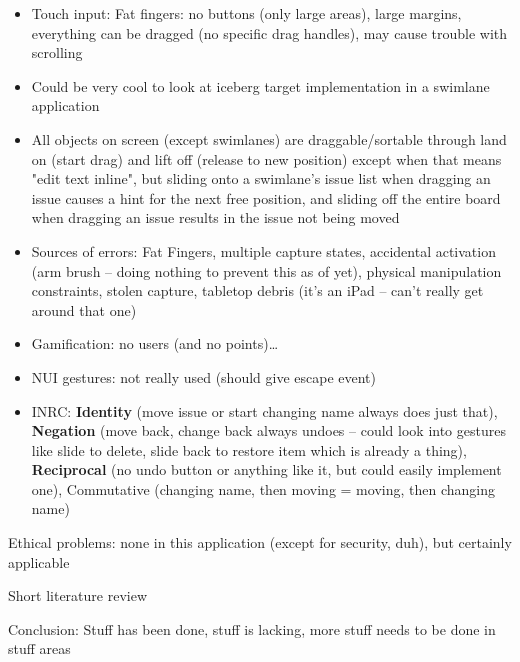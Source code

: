 \begin{itemize}
  \item Touch input: Fat fingers: no buttons (only large areas), large margins, everything can be dragged (no specific drag handles), may cause trouble with scrolling
  \item Could be very cool to look at iceberg target implementation in a swimlane application %
  \item All objects on screen (except swimlanes) are draggable/sortable through land on (start drag) and lift off (release to new position) except when that means "edit text inline", but sliding onto a swimlane's issue list when dragging an issue causes a hint for the next free position, and sliding off the entire board when dragging an issue results in the issue not being moved %
  \item Sources of errors: Fat Fingers, multiple capture states, accidental activation (arm brush – doing nothing to prevent this as of yet), physical manipulation constraints, stolen capture, tabletop debris (it's an iPad – can't really get around that one)
  \item Gamification: no users (and no points)\dots %

  \item NUI gestures: not really used (should give escape event)
  \item INRC: \textbf{Identity} (move issue or start changing name always does just that), \textbf{Negation} (move back, change back always undoes – could look into gestures like slide to delete, slide back to restore item which is already a thing), \textbf{Reciprocal} (no undo button or anything like it, but could easily implement one), Commutative (changing name, then moving = moving, then changing name) %
\end{itemize}

Ethical problems: none in this application (except for security, duh), but certainly applicable %

Short literature review %

Conclusion: Stuff has been done, stuff is lacking, more stuff needs to be done in stuff areas